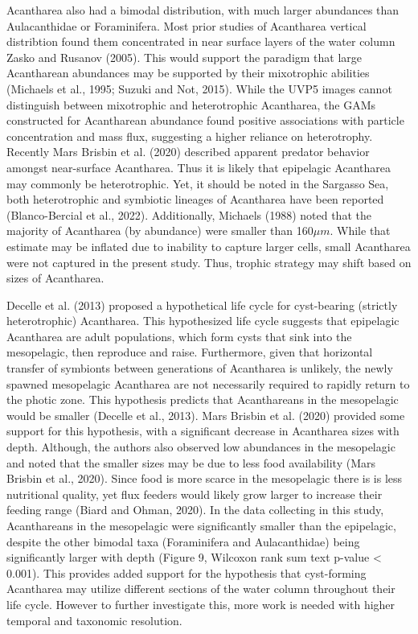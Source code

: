 \documentclass[
]{article}
\begin{document}
Acantharea also had a bimodal distribution, with much larger abundances
than Aulacanthidae or Foraminifera. Most prior studies of Acantharea
vertical distribtion found them concentrated in near surface layers of
the water column Zasko and Rusanov (2005). This would support the
paradigm that large Acantharean abundances may be supported by their
mixotrophic abilities (Michaels et al., 1995; Suzuki and Not, 2015).
While the UVP5 images cannot distinguish between mixotrophic and
heterotrophic Acantharea, the GAMs constructed for Acantharean abundance
found positive associations with particle concentration and mass flux,
suggesting a higher reliance on heterotrophy. Recently Mars Brisbin et
al. (2020) described apparent predator behavior amongst near-surface
Acantharea. Thus it is likely that epipelagic Acantharea may commonly be
heterotrophic. Yet, it should be noted in the Sargasso Sea, both
heterotrophic and symbiotic lineages of Acantharea have been reported
(Blanco-Bercial et al., 2022). Additionally, Michaels (1988) noted that
the majority of Acantharea (by abundance) were smaller than
160\(\mu m\). While that estimate may be inflated due to inability to
capture larger cells, small Acantharea were not captured in the present
study. Thus, trophic strategy may shift based on sizes of Acantharea.

Decelle et al. (2013) proposed a hypothetical life cycle for
cyst-bearing (strictly heterotrophic) Acantharea. This hypothesized life
cycle suggests that epipelagic Acantharea are adult populations, which
form cysts that sink into the mesopelagic, then reproduce and raise.
Furthermore, given that horizontal transfer of symbionts between
generations of Acantharea is unlikely, the newly spawned mesopelagic
Acantharea are not necessarily required to rapidly return to the photic
zone. This hypothesis predicts that Acanthareans in the mesopelagic
would be smaller (Decelle et al., 2013). Mars Brisbin et al. (2020)
provided some support for this hypothesis, with a significant decrease
in Acantharea sizes with depth. Although, the authors also observed low
abundances in the mesopelagic and noted that the smaller sizes may be
due to less food availability (Mars Brisbin et al., 2020). Since food is
more scarce in the mesopelagic there is is less nutritional quality, yet
flux feeders would likely grow larger to increase their feeding range
(Biard and Ohman, 2020). In the data collecting in this study,
Acanthareans in the mesopelagic were significantly smaller than the
epipelagic, despite the other bimodal taxa (Foraminifera and
Aulacanthidae) being significantly larger with depth (Figure 9, Wilcoxon
rank sum text p-value \textless{} 0.001). This provides added support
for the hypothesis that cyst-forming Acantharea may utilize different
sections of the water column throughout their life cycle. However to
further investigate this, more work is needed with higher temporal and
taxonomic resolution.
\end{document}
